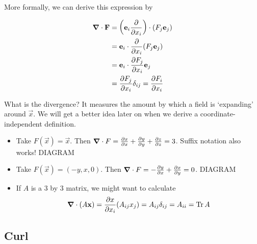 \documentclass{../../template/note}
\begin{document}
    More formally, we can derive this expression by

    \begin{align*}
        \div \vec F &= \left(\vec e_i \pd{}{x_i}\right) \cdot (F_j \vec e_j) \\
        &= \vec e_i \cdot \pd{}{x_i}(F_j \vec e_j) \\
        &= \vec e_i \cdot \pd{F_j}{x_i} \vec e_j \\
        &= \pd{F_j}{x_i} \delta_{ij} = \pd{F_i}{x_i}
    \end{align*}
    
    What is the divergence? It measures the amount by which a field is `expanding' around \(\vec x\). We will get a better idea later on when we derive a coordinate-independent definition.

    \begin{example*}
        \begin{itemize}
            \item Take \(F(\vec x) = \vec x\). Then \(\div F = \pd{x}{x} + \pd{y}{y} + \pd{z}{z} = 3\). Suffix notation also works! DIAGRAM
            \item Take \(F(\vec x) = (-y, x, 0)\). Then \(\div F = -\pd{y}{x} + \pd{x}{y} = 0\). DIAGRAM
            \item If \(A\) is a 3 by 3 matrix, we might want to calculate
            \begin{align*}
                \div (A \vec x) = \pd{x}{x_i} (A_{ij}x_j) = A_{ij} \delta_{ij} = A_{ii} = \Tr A
            \end{align*}
        \end{itemize}
    \end{example*}
    
    \subsection{Curl}
\end{document}
